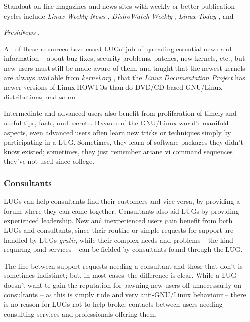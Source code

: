 \documentclass{HOWTO}
\begin{document}
Standout on-line magazines and news sites with weekly or better publication 
cycles include {\itshape 
\emph{Linux Weekly News} \texttt{\adaurl}
\/}, 
{\itshape 
\emph{DistroWatch Weekly} \texttt{\adburl}
\/},
{\itshape 
\emph{Linux Today} \texttt{\adcurl}
\/}, and

\emph{FreshNews} \texttt{\addurl}
.

All of these resources have eased LUGs' job of spreading essential
news and information --  about bug fixes, security problems, patches, 
new kernels, etc., but new users must still be made aware of
them, and taught that the newest kernels are always
available from 
\emph{kernel.org} \texttt{\adeurl}
,
that the 
\emph{Linux Documentation Project} \texttt{\adfurl}
 has newer versions of Linux HOWTOs than do DVD/CD-based GNU/Linux
distributions, and so on.

Intermediate and advanced users also benefit from proliferation of
timely and useful tips, facts, and secrets. Because of the GNU/Linux
world's manifold aspects, even advanced users often learn new tricks or
techniques simply by participating in a LUG. Sometimes, they learn of
software packages they didn't know existed; sometimes, they just
remember arcane {\ttfamily vi} command sequences they've not used since
college.




\subsubsection{Consultants}



LUGs can help consultants find their customers and vice-versa,
by providing a forum where they can come together.
Consultants also aid LUGs by providing experienced leadership.
New and inexperienced users gain benefit from both LUGs and
consultants, since their routine or simple requests for support are
handled by LUGs {\itshape gratis\/}, while their complex needs and problems --
the kind requiring paid services -- can be fielded by consultants found 
through the LUG.

The line between support requests needing a consultant and those
that don't is sometimes indistinct; but, in most cases, the difference
is clear. While a LUG doesn't want to gain the reputation for
pawning new users off unnecessarily on consultants -- as this is simply
rude and very anti-GNU/Linux behaviour -- there is no reason for LUGs not to
help broker contacts between users needing consulting services and
professionals offering them.
\end{document}
